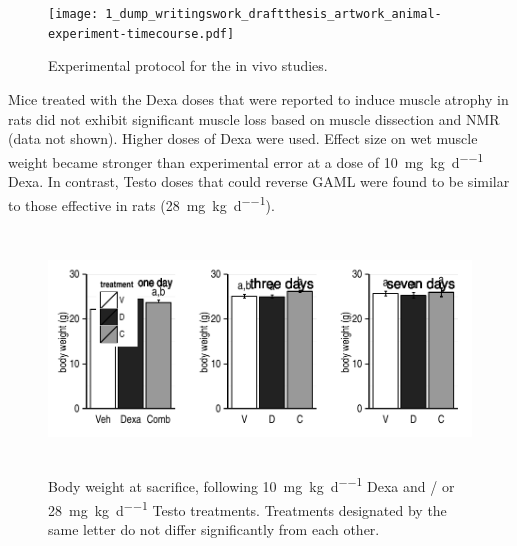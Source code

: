 \documentclass[12pt,english]{report}\usepackage[]{graphicx}\usepackage[]{color}
\newenvironment{knitrout}{}{} %
\begin{document}
\begin{figure}
\texttt{[image: 1\_dump\_writingswork\_draftthesis\_artwork\_animal-experiment-timecourse.pdf]}

\protect\caption{Experimental protocol for the in vivo studies.\label{fig:Experimental-protocol-for}}
\end{figure}


Mice treated with the Dexa doses that were reported to induce muscle
atrophy in rats did not exhibit significant muscle loss based on muscle
dissection and NMR (data not shown). Higher doses of Dexa were used.
Effect size on wet muscle weight became stronger than experimental
error at a dose of \SI{10}{\milli\gram\per\kilo\gram\per\day} Dexa.
In contrast, Testo doses that could reverse GAML were found to be
similar to those effective in rats (\SI{28}{\milli\gram\per\kilo\gram\per\day}).

\begin{figure}
\begin{knitrout}
\color{fgcolor}
\includegraphics[width=6in,height=2.5in]{figure/unnamed-chunk-1-1} 

\end{knitrout}

\protect\caption[Body weight at sacrifice, following Dexa and / or Testo treatments.]{Body weight at sacrifice, following \SI{10}{\milli\gram\per\kilo\gram\per\day}
Dexa and / or \SI{28}{\milli\gram\per\kilo\gram\per\day} Testo treatments.
Treatments designated by the same letter do not differ significantly
from each other.\label{fig:Body-weight-at}}
\end{figure}
\end{document}

